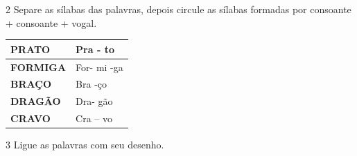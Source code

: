 


\num{2} Separe as sílabas das palavras, depois circule as sílabas formadas por
consoante + consoante + vogal.


\begin{longtable}[]{@{}ll@{}}
\toprule
\textbf{PRATO} & Pra - to\tabularnewline
\midrule
\endhead
\textbf{FORMIGA} & For- mi -ga\tabularnewline
\textbf{BRAÇO} & Bra -ço\tabularnewline
\textbf{DRAGÃO} & Dra- gão\tabularnewline
\textbf{CRAVO} & Cra -- vo\tabularnewline
\bottomrule
\end{longtable}

\num{3} Ligue as palavras com seu desenho.


